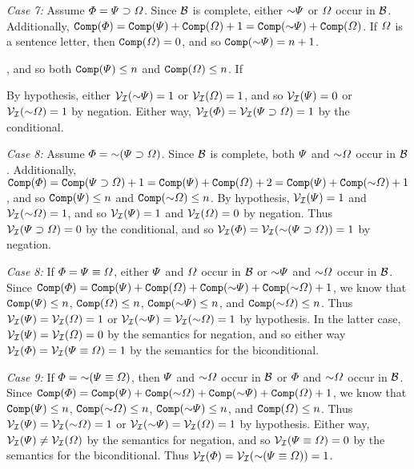 \textit{Case 7:} 
Assume $\varPhi=\varPsi\supset\varOmega$.
Since $\mathcal{B}$ is complete, either $\enot\metaB$ or $\varOmega$ occur in $\mathcal{B}$.
Additionally, $\comp(\metaA) = \comp(\metaB) + \comp(\metaC) + 1 = \comp(\enot\metaB) + \comp(\metaC)$.
If $\varOmega$ is a sentence letter, then $\texttt{Comp}(\varOmega)=0$, and so $\comp(\enot\metaB)=n+1$.

, and so both $\texttt{Comp}(\varPsi)\leq n$ and $\texttt{Comp}(\varOmega)\leq n$.
If 

By hypothesis, either $\V{\I}(\enot\metaB)=1$ or $\mathcal{V}_{\mathcal{I}}(\varOmega)=1$, and so $\mathcal{V}_{\mathcal{I}}(\varPsi)=0$ or $\V{\I}(\enot\metaC)=1$ by negation.
Either way, $\mathcal{V}_{\mathcal{I}}(\varPhi)=\mathcal{V}_{\mathcal{I}}(\varPsi\supset\varOmega)=1$ by the conditional.

\textit{Case 8:} 
Assume $\metaA=\enot(\metaB\eif\metaC)$.
Since $\mathcal{B}$ is complete, both $\varPsi$ and $\enot\metaC$ occur in $\mathcal{B}$.
Additionally, $\comp(\metaA) = \comp(\metaB\eif\metaC) + 1 = \comp(\metaB) + \comp(\metaC) + 2 = \comp(\metaB) + \comp(\enot\metaC) + 1$, and so $\texttt{Comp}(\varPsi)\leq n$ and $\comp(\enot\metaC)\leq n$.
By hypothesis, $\mathcal{V}_{\mathcal{I}}(\varPsi)=1$ and $\V{\I}(\enot\metaC)=1$, and so $\mathcal{V}_{\mathcal{I}}(\varPsi)=1$ and $\mathcal{V}_{\mathcal{I}}(\varOmega)=0$ by negation.
Thus $\mathcal{V}_{\mathcal{I}}(\varPsi\supset\varOmega)=0$ by the conditional, and so $\V{\I}(\metaA)=\V{\I}(\enot(\metaB\eif\metaC))=1$ by negation.

\textit{Case 8:} 
If $\varPhi=\varPsi\equiv\varOmega$, either $\varPsi$ and $\varOmega$ occur in $\mathcal{B}$ or $\enot\metaB$ and $\enot\metaC$ occur in $\mathcal{B}$.
Since $\comp(\metaA) = \comp(\metaB) + \comp(\metaC) + \comp(\enot\metaB) + \comp(\enot\metaC) + 1$, we know that $\texttt{Comp}(\varPsi)\leq n$, $\texttt{Comp}(\varOmega)\leq n$, $\comp(\enot\metaB)\leq n$, and $\comp(\enot\metaC)\leq n$.
Thus $\mathcal{V}_{\mathcal{I}}(\varPsi)=\mathcal{V}_{\mathcal{I}}(\varOmega)=1$ or $\V{\I}(\enot\metaB)=\V{\I}(\enot\metaC)=1$ by hypothesis.  
In the latter case, $\mathcal{V}_{\mathcal{I}}(\varPsi)=\mathcal{V}_{\mathcal{I}}(\varOmega)=0$ by the semantics for negation, and so either way $\mathcal{V}_{\mathcal{I}}(\varPhi)=\mathcal{V}_{\mathcal{I}}(\varPsi\equiv\varOmega)=1$ by the semantics for the biconditional.

\textit{Case 9:} 
If $\metaA=\enot(\metaB\eiff\metaC)$, then $\varPsi$ and $\enot\metaC$ occur in $\mathcal{B}$ or $\varPhi$ and $\enot\metaC$ occur in $\mathcal{B}$.
Since $\comp(\metaA) = \comp(\metaB) + \comp(\enot\metaC) + \comp(\enot\metaB) + \comp(\metaC) + 1$, we know that $\texttt{Comp}(\varPsi)\leq n$, $\comp(\enot\metaC)\leq n$, $\comp(\enot\metaB)\leq n$, and $\texttt{Comp}(\varOmega)\leq n$.
Thus $\V{\I}(\metaB)=\V{\I}(\enot\metaC)=1$ or $\V{\I}(\enot\metaB)=\V{\I}(\metaC)=1$ by hypothesis.  
Either way, $\mathcal{V}_{\mathcal{I}}(\varPsi)\neq\mathcal{V}_{\mathcal{I}}(\varOmega)$ by the semantics for negation, and so $\mathcal{V}_{\mathcal{I}}(\varPsi\equiv\varOmega)=0$ by the semantics for the biconditional.
Thus $\V{\I}(\metaA)=\V{\I}(\enot(\metaB\eiff\metaC))=1$.

